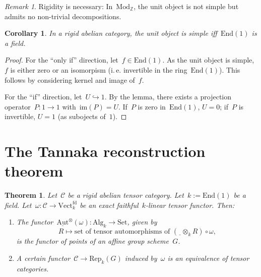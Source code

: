 \documentclass[a4paper,english,12pt]{scrartcl}
\theoremstyle{definition}
\theoremstyle{plain}
\newtheorem{thm}[defn]{Theorem}
\newtheorem{cor}[defn]{Corollary}
\theoremstyle{remark}
\newtheorem{rem}[defn]{Remark}
\newcommand{\ZZ}{\mathbb{Z}}
\newcommand{\C}{\mathcal{C}}
\renewcommand{\_}{\mathpunct{.}\,}
\newcommand{\?}{\,{:}\,}
\newcommand{\Mod}{\mathrm{Mod}}
\newcommand{\Set}{\mathrm{Set}}
\newcommand{\Vect}{\mathrm{Vect}}
\newcommand{\End}{\mathrm{End}}
\newcommand{\freist}{\underline{\ \ }}
\newcommand{\Rep}{\mathrm{Rep}}
\newcommand{\im}{\mathrm{im}}
\begin{document}
\begin{rem}Rigidity is necessary: In~$\Mod_\ZZ$, the unit object is not simple
but admits no non-trivial decompositions.\end{rem}

\begin{cor}In a rigid abelian category, the unit object is simple iff~$\End(1)$
is a field.\end{cor}
\begin{proof}For the ``only if'' direction, let~$f \in \End(1)$. As the unit
object is simple, $f$ is either zero or an isomorpism (i.\,e. invertible in the
ring~$\End(1)$). This follows by considering kernel and image of~$f$.

For the ``if'' direction, let~$U \hookrightarrow 1$. By the lemma, there exists
a projection operator~$P : 1 \to 1$ with~$\im(P) = U$. If~$P$ is zero
in~$\End(1)$, $U = 0$; if~$P$ is invertible, $U = 1$ (as subojects
of~$1$).\end{proof}


\section{The Tannaka reconstruction theorem}

\begin{thm}Let~$\C$ be a rigid abelian tensor category. Let~$k := \End(1)$ be a
field. Let~$\omega : \C \to \Vect_k^\mathrm{fd}$ be an exact faithful~$k$-linear
tensor functor. Then:
\begin{enumerate}
\item The functor~$\underline{\mathrm{Aut}}^\otimes(\omega) : \mathrm{Alg}_k
\to \Set$, given by
\[ R \longmapsto \text{set of tensor automorphisms of~$(\freist \otimes_k R)
\circ \omega$}, \]
is the functor of points of an affine group scheme~$G$.
\item A certain functor~$\C \to \Rep_k(G)$ induced by~$\omega$ is an
equivalence of tensor categories.
\end{enumerate}
\end{thm}
\end{document}

